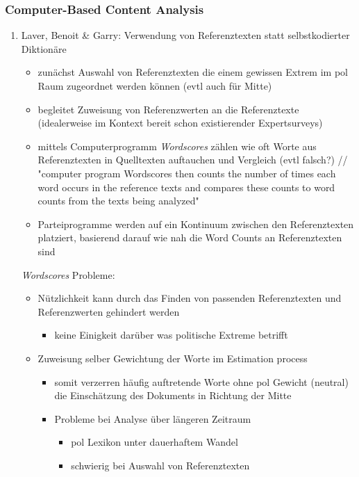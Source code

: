 \documentclass[11pt]{article}
\begin{document}
\subsubsection{Computer-Based Content Analysis}
\label{sec:org35946a4}
\begin{enumerate}
\item Laver, Benoit \& Garry: Verwendung von Referenztexten statt selbstkodierter Diktionäre
\label{sec:orgb07ec79}
\begin{itemize}
\item zunächst Auswahl von Referenztexten die einem gewissen Extrem im pol Raum zugeordnet werden können (evtl auch für Mitte)
\item begleitet Zuweisung von Referenzwerten an die Referenztexte (idealerweise im Kontext bereit schon existierender Expertsurveys)
\item mittels Computerprogramm \emph{Wordscores} zählen wie oft Worte aus Referenztexten in Quelltexten auftauchen und Vergleich (evtl falsch?) // "computer program Wordscores then counts the number of times each word occurs in the reference texts and compares these counts to word counts from the texts being analyzed"
\item Parteiprogramme werden auf ein Kontinuum zwischen den Referenztexten platziert, basierend darauf wie nah die Word Counts an Referenztexten sind
\end{itemize}

\emph{Wordscores} Probleme:
\begin{itemize}
\item Nützlichkeit kann durch das Finden von passenden Referenztexten und Referenzwerten gehindert werden
\begin{itemize}
\item keine Einigkeit darüber was politische Extreme betrifft
\end{itemize}
\item Zuweisung selber Gewichtung der Worte im  Estimation process
\begin{itemize}
\item somit verzerren häufig auftretende Worte ohne pol Gewicht (neutral) die Einschätzung des Dokuments in Richtung der Mitte
\end{itemize}
\begin{itemize}
\item Probleme bei Analyse über längeren Zeitraum
\begin{itemize}
\item pol Lexikon unter dauerhaftem Wandel
\item schwierig bei Auswahl von Referenztexten
\end{itemize}
\end{itemize}
\end{itemize}
\end{enumerate}
\end{document}
